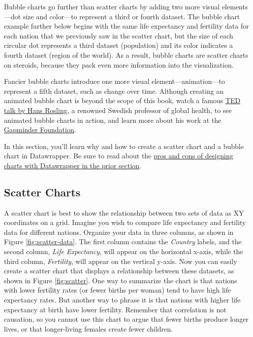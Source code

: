 \documentclass[
  english,
]{book}
\begin{document}
Bubble charts go further than scatter charts by adding two more visual elements---dot size and color---to represent a third or fourth dataset. The bubble chart example further below begins with the same life expectancy and fertility data for each nation that we previously saw in the scatter chart, but the size of each circular dot represents a third dataset (population) and its color indicates a fourth dataset (region of the world). As a result, bubble charts are scatter charts on steroids, because they pack even more information into the visualization.

Fancier bubble charts introduce one more visual element---animation---to represent a fifth dataset, such as change over time. Although creating an animated bubble chart is beyond the scope of this book, watch a famous \href{https://www.ted.com/talks/hans_rosling_the_best_stats_you_ve_ever_seen}{TED talk by Hans Rosling}, a renowned Swedish professor of global health, to see animated bubble charts in action, and learn more about his work at the \href{https://www.gapminder.org/}{Gapminder Foundation}.

In this section, you'll learn why and how to create a scatter chart and a bubble chart in Datawrapper. Be sure to read about the \href{chart-datawrapper.html}{pros and cons of designing charts with Datawrapper in the prior section}.

\hypertarget{scatter-charts}{%
\subsection*{Scatter Charts}\label{scatter-charts}}

A scatter chart is best to show the relationship between two sets of data as XY coordinates on a grid. Imagine you wish to compare life expectancy and fertility data for different nations. Organize your data in three columns, as shown in Figure \ref{fig:scatter-data}. The first column contains the \emph{Country} labels, and the second column, \emph{Life Expectancy}, will appear on the horizontal x-axis, while the third column, \emph{Fertility}, will appear on the vertical y-axis. Now you can easily create a scatter chart that displays a relationship between these datasets, as shown in Figure \ref{fig:scatter}. One way to summarize the chart is that nations with lower fertility rates (or fewer births per woman) tend to have high life expectancy rates. But another way to phrase it is that nations with higher life expectancy at birth have lower fertility. Remember that correlation is not causation, so you cannot use this chart to argue that fewer births produce longer lives, or that longer-living females create fewer children.
\end{document}
